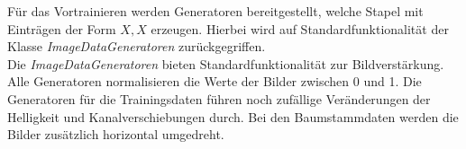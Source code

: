 	Für das Vortrainieren werden Generatoren bereitgestellt, welche Stapel mit Einträgen der Form $X ,X$ erzeugen. Hierbei wird auf Standardfunktionalität der Klasse \textit{ImageDataGeneratoren} zurückgegriffen. \\
	Die \textit{ImageDataGeneratoren} bieten Standardfunktionalität zur Bildverstärkung. Alle Generatoren normalisieren die Werte der Bilder zwischen 0 und 1. Die Generatoren für die Trainingsdaten führen noch zufällige Veränderungen der Helligkeit und Kanalverschiebungen durch. Bei den Baumstammdaten werden die Bilder zusätzlich horizontal umgedreht. 


 


 
